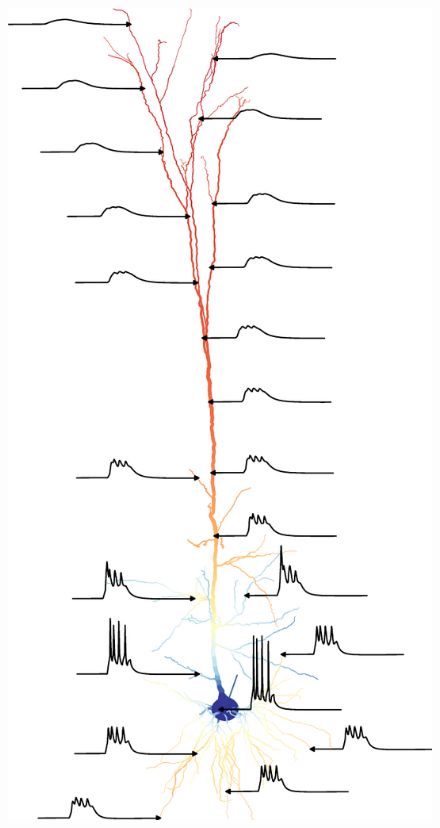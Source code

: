 \documentclass{beamer}
\begin{document}
\begin{frame}[t, fragile]
\begin{columns}
    \begin{column}{0.21\textwidth}
      \begin{figure}[h]
        \includegraphics[width=\textwidth]{./benchmark/5a_cropped.pdf}
      \end{figure}
    \end{column}
  \end{columns}


\end{frame}
\end{document}
